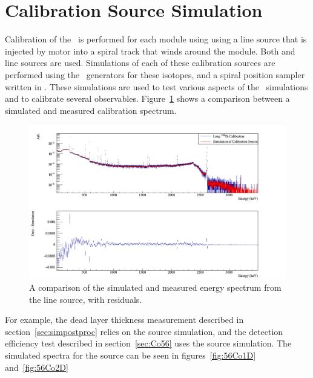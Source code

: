 \documentclass[/main.tex]{subfiles}
\begin{document}
\section{Calibration Source Simulation}
Calibration of the \MJD\ is performed for each module using using a line source that is injected by motor into a spiral track that winds around the module.
Both  and  line sources are used.
Simulations of each of these calibration sources are performed using the \geant\ generators for these isotopes, and a spiral position sampler written in \Mage.
These simulations are used to test various aspects of the \Mage\ simulations and to calibrate several observables.
Figure~\ref{fig:228Thsim} shows a comparison between a simulated and measured  calibration spectrum.
\begin{figure}
  \centering
  \includegraphics[width=\textwidth]{Th228CalSim}
  \caption[Comparison of simulated and measured  calibration spectrum]{\label{fig:228Thsim}
    A comparison of the simulated and measured energy spectrum from the  line source, with residuals.
  }
\end{figure}
For example, the dead layer thickness measurement described in section~\ref{sec:simpostproc} relies on the  source simulation, and the detection efficiency test described in section~\ref{sec:Co56} uses the  source simulation.
The simulated spectra for the  source can be seen in figures~\ref{fig:56Co1D} and~\ref{fig:56Co2D}
\end{document}
